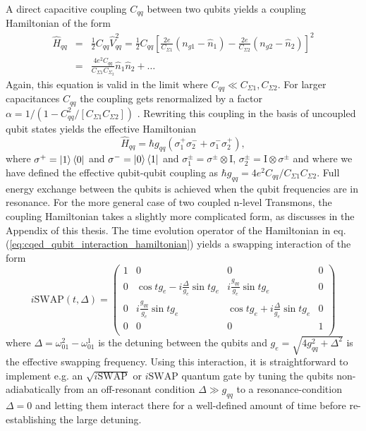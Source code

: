 A direct capacitive coupling $C_{qq}$ between two qubits yields a coupling Hamiltonian of the form
%
\begin{eqnarray}
\hat{H}_{qq} & = & \frac{1}{2}C_{qq}\hat{V}_{qq}^2 = \frac{1}{2}C_{qq}\left[\frac{2e}{C_{\Sigma 1}}(n_{g1}-\hat{n}_1)-\frac{2e}{C_{\Sigma 2}}(n_{g2}-\hat{n}_2)\right]^2 \\
& = & \frac{4e^2 C_{qq}}{C_{\Sigma 1}C_{\Sigma_2}}\hat{n}_1\hat{n}_2+\hdots \label{eq:cqed_capacitive_coupling}
\end{eqnarray}
%
Again, this equation is valid in the limit where $C_{qq} \ll C_{\Sigma 1},C_{\Sigma 2}$. For larger capacitances $C_{qq}$ the coupling gets renormalized by a factor $\alpha = 1/(1-C_{qq}^2/[C_{\Sigma 1}C_{\Sigma 2}])$ \citep{nguyen_cooper_2008}. Rewriting this coupling in the basis of uncoupled qubit states yields the effective Hamiltonian
%
\begin{equation}
\hat{H}_{qq} = \hbar g_{qq}\left(\sigma^+_1\sigma^-_2+\sigma^-_1\sigma^+_2\right), \label{eq:cqed_qubit_interaction_hamiltonian}
\end{equation}
%
where $\sigma^+=\left| 1 \right>\left< 0 \right|$ and $\sigma^-=\left| 0 \right>\left< 1 \right|$ and $\sigma_1^\pm=\sigma^\pm\otimes \mathrm{I}$, $\sigma_2^\pm = \mathrm{I}\otimes \sigma^\pm$ and where we have defined the effective qubit-qubit coupling as $\hbar g_{qq} = 4e^2 C_{qq}/C_{\Sigma 1}C_{\Sigma 2}$. Full energy exchange between the qubits is achieved when the qubit frequencies are in resonance. For the more general case of two coupled n-level Transmons, the coupling Hamiltonian takes a slightly more complicated form, as discusses in the Appendix of this thesis. The time evolution operator of the Hamiltonian in eq. (\ref{eq:cqed_qubit_interaction_hamiltonian}) yields a swapping interaction of the form
%
\begin{equation}
i\mathrm{SWAP}(t,\Delta) = \left(
			\begin{array}{cccc}
				1 & 0 & 0 & 0 \\
				0 & \cos{t g_{e}}-i\frac{\Delta}{g_e}\sin{t g_{e}} & i \frac{g_{qq}}{g_e}\sin{t g_{e}} & 0 \\
				0 & i\frac{g_{qq}}{g_e}\sin{t g_{e}} & \cos{t g_{e}}+i\frac{\Delta}{g_{e}}\sin{t g_{e}} & 0 \\
				0 & 0 & 0 & 1 \\
			\end{array}
	\right) \label{eq:swap_with_detuning}
\end{equation}
%
where $\Delta = \omega_{01}^2-\omega_{01}^1$ is the detuning between the qubits and $g_e = \sqrt{4g_{qq}^2+\Delta^2}$ is the effective swapping frequency. Using this interaction, it is straightforward to implement e.g. an $\sqrt{i\mathrm{SWAP}}$ or $i\mathrm{SWAP}$ quantum gate by tuning the qubits non-adiabatically from an off-resonant condition $\Delta \gg g_{qq}$ to a resonance-condition $\Delta = 0$ and letting them interact there for a well-defined amount of time before re-establishing the large detuning.

